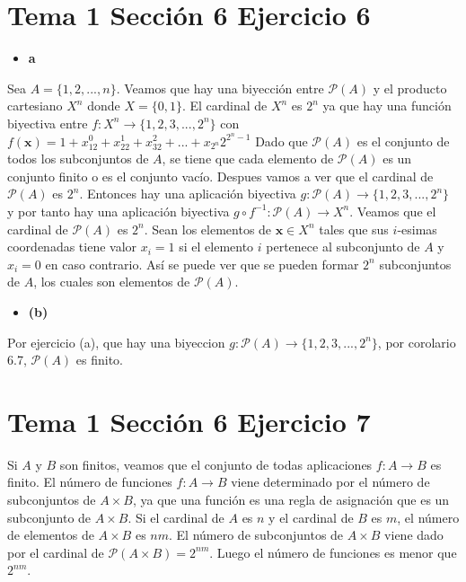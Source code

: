 \documentclass{article}
\newcommand{\vect}[1]{\boldsymbol{#1}}
\begin{document}
\section{Tema 1 Sección 6 Ejercicio 6}
\begin{itemize}
\item \bf a \rm
\end{itemize}
Sea $A=\{1,2,...,n\}$. Veamos que hay una biyección entre $\mathcal{P} (A)$ y el producto cartesiano $X^n$ donde $X=\{0,1\}$. El cardinal de $X^n$ es $2^n$ ya que hay una función biyectiva entre $f:X^n\rightarrow \{1,2,3,...,2^n\}$ con $f(\vect{x})=1 + x_12^0+x_22^1+ x_32^2+ ...+x_{2^n}2^{2^n-1}$ Dado que $\mathcal{P} (A)$ es el conjunto de todos los subconjuntos de $A$, se tiene que cada elemento de $\mathcal{P} (A)$ es un conjunto finito o es el conjunto vacío. Despues vamos a ver que el cardinal de $\mathcal{P} (A)$ es $2^n$. Entonces hay una aplicación biyectiva $g:\mathcal{P} (A)\rightarrow \{1,2,3,...,2^n\}$ y por tanto hay una aplicación biyectiva $g\circ f^{-1}:\mathcal{P} (A)\rightarrow X^n$. Veamos que el cardinal de $\mathcal{P} (A)$ es $2^{n}$. Sean los elementos de  $\vect{x}\in X^n$ tales que sus $i$-esimas coordenadas tiene valor $x_i=1$ si el elemento $i$ pertenece al subconjunto de $A$ y $x_i=0$ en caso contrario. Así se puede ver que se pueden formar $2^n$ subconjuntos de $A$, los cuales son elementos de   $\mathcal{P} (A)$.
\begin{itemize}
\item \bf (b) \rm
\end{itemize}
Por ejercicio (a), que hay una biyeccion $g:\mathcal{P} (A)\rightarrow \{1,2,3,...,2^n\}$, por corolario 6.7, $\mathcal{P} (A)$ es finito.
\section{Tema 1 Sección 6 Ejercicio 7}
Si $A$ y $B$ son finitos, veamos que el conjunto de todas  aplicaciones $f:A\rightarrow B$ es finito. El número de funciones $f:A\rightarrow B$ viene determinado por el número de subconjuntos de $A\times B$, ya que una función es una regla de asignación que es un subconjunto de $A\times B$. Si el cardinal de $A$ es $n$ y el cardinal de $B$ es $m$, el número de elementos de $A\times B$ es $nm$. El número de subconjuntos de $A\times B$ viene dado por el cardinal de $\mathcal{P}(A\times B)=2^{nm}$. Luego el número de funciones es menor que $2^{nm}$.
%
%
\end{document}
